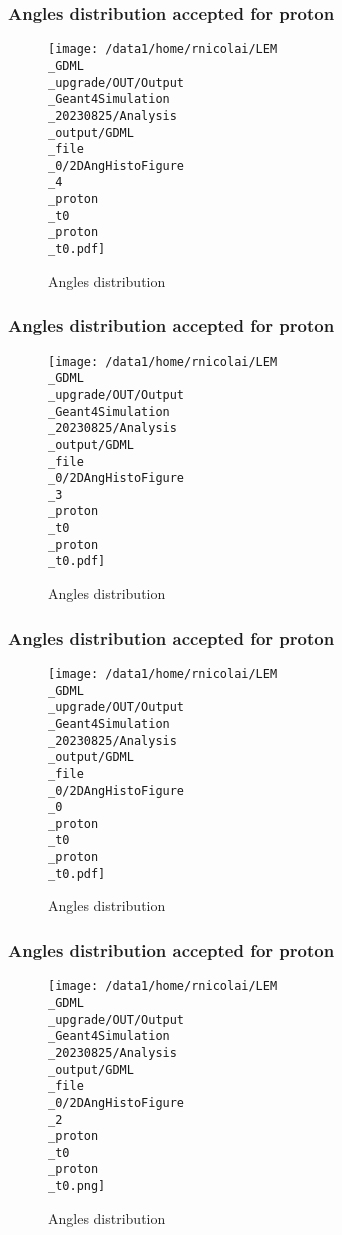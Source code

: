 \documentclass[8pt]{beamer}
\begin{document}
            \begin{frame}
                \frametitle{Angles distribution accepted for proton}
            
        \begin{figure}[h]
            \centering
            \texttt{[image: /data1/home/rnicolai/LEM\\\_GDML\\\_upgrade/OUT/Output\\\_Geant4Simulation\\\_20230825/Analysis\\\_output/GDML\\\_file\\\_0/2DAngHistoFigure\\\_4\\\_proton\\\_t0\\\_proton\\\_t0.pdf]}
            \caption{Angles distribution}
        \end{figure}
        
            \end{frame}
            
            \begin{frame}
                \frametitle{Angles distribution accepted for proton}
            
        \begin{figure}[h]
            \centering
            \texttt{[image: /data1/home/rnicolai/LEM\\\_GDML\\\_upgrade/OUT/Output\\\_Geant4Simulation\\\_20230825/Analysis\\\_output/GDML\\\_file\\\_0/2DAngHistoFigure\\\_3\\\_proton\\\_t0\\\_proton\\\_t0.pdf]}
            \caption{Angles distribution}
        \end{figure}
        
            \end{frame}
            
            \begin{frame}
                \frametitle{Angles distribution accepted for proton}
            
        \begin{figure}[h]
            \centering
            \texttt{[image: /data1/home/rnicolai/LEM\\\_GDML\\\_upgrade/OUT/Output\\\_Geant4Simulation\\\_20230825/Analysis\\\_output/GDML\\\_file\\\_0/2DAngHistoFigure\\\_0\\\_proton\\\_t0\\\_proton\\\_t0.pdf]}
            \caption{Angles distribution}
        \end{figure}
        
            \end{frame}
            
            \begin{frame}
                \frametitle{Angles distribution accepted for proton}
            
        \begin{figure}[h]
            \centering
            \texttt{[image: /data1/home/rnicolai/LEM\\\_GDML\\\_upgrade/OUT/Output\\\_Geant4Simulation\\\_20230825/Analysis\\\_output/GDML\\\_file\\\_0/2DAngHistoFigure\\\_2\\\_proton\\\_t0\\\_proton\\\_t0.png]}
            \caption{Angles distribution}
        \end{figure}
        
            \end{frame}
            
\end{document}
